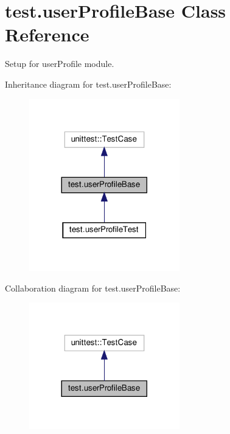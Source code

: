 \hypertarget{classtest_1_1userProfileBase}{}\section{test.\+user\+Profile\+Base Class Reference}
\label{classtest_1_1userProfileBase}


Setup for user\+Profile module.  




Inheritance diagram for test.\+user\+Profile\+Base\+:\nopagebreak
\begin{figure}[H]
\begin{center}
\leavevmode
\includegraphics[width=185pt]{classtest_1_1userProfileBase__inherit__graph}
\end{center}
\end{figure}


Collaboration diagram for test.\+user\+Profile\+Base\+:\nopagebreak
\begin{figure}[H]
\begin{center}
\leavevmode
\includegraphics[width=185pt]{classtest_1_1userProfileBase__coll__graph}
\end{center}
\end{figure}
